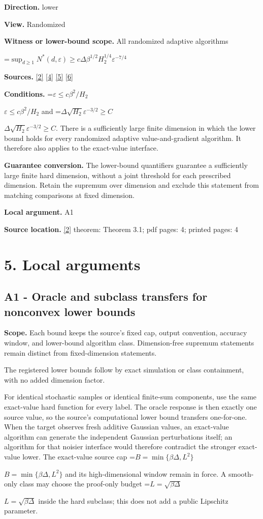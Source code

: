 \documentclass[10pt,a4paper]{article}
\newcommand{\AtlasMath}[1]{\par\begingroup\centering\setbox0=\hbox{$\displaystyle #1$}\ifdim\wd0>1.4\linewidth\typeout{ATLAS WIDE FORMULA: \the\wd0}\fi\ifdim\wd0>\linewidth\resizebox{\linewidth}{!}{\box0}\else\box0\fi\par\endgroup}
\newcommand{\AtlasInlineMath}[1]{\begingroup\setbox0=\hbox{$#1$}\ifdim\wd0>.4\linewidth\endgroup\AtlasMath{#1}\else\endgroup$#1$\fi}
\begin{document}
\textbf{Direction.} lower

\textbf{View.} Randomized

\textbf{Witness or lower-bound scope.} All randomized adaptive algorithms

\AtlasMath{\sup_{d\ge1}N^*(d,\varepsilon)\ge c\Delta\beta^{1/2}H_2^{1/4}\varepsilon^{-7/4}}
\textbf{Sources.} \href{https://arxiv.org/pdf/2610.00245v2}{[2]} \href{https://arxiv.org/html/2610.19652v1}{[4]} \href{https://arxiv.org/html/2609.00045v3}{[5]} \href{https://arxiv.org/html/2610.17074v1}{[6]}

\textbf{Conditions.} \AtlasInlineMath{\varepsilon\le c\beta^2/H_2} and \AtlasInlineMath{\Delta\sqrt{H_2}\varepsilon^{-3/2}\ge C}. There is a sufficiently large finite dimension in which the lower bound holds for every randomized adaptive value-and-gradient algorithm. It therefore also applies to the exact-value interface.

\textbf{Guarantee conversion.} The lower-bound quantifiers guarantee a sufficiently large finite hard dimension, without a joint threshold for each prescribed dimension. Retain the supremum over dimension and exclude this statement from matching comparisons at fixed dimension.

\textbf{Local argument.} A1

\textbf{Source location.} \href{https://arxiv.org/pdf/2610.00245v2}{[2]} theorem: Theorem 3.1; pdf pages: 4; printed pages: 4

\section{5. Local arguments}
\subsection{A1 - Oracle and subclass transfers for nonconvex lower bounds}
\textbf{Scope.} Each bound keeps the source's fixed cap, output convention, accuracy window, and lower-bound algorithm class. Dimension-free supremum statements remain distinct from fixed-dimension statements.

The registered lower bounds follow by exact simulation or class containment, with no added dimension factor.

For identical stochastic samples or identical finite-sum components, use the same exact-value hard function for every label. The oracle response is then exactly one source value, so the source's computational lower bound transfers one-for-one. When the target observes fresh additive Gaussian values, an exact-value algorithm can generate the independent Gaussian perturbations itself; an algorithm for that noisier interface would therefore contradict the stronger exact-value lower. The exact-value source cap \AtlasInlineMath{B=\min\{\beta\Delta,L^2\}} and its high-dimensional window remain in force. A smooth-only class may choose the proof-only budget \AtlasInlineMath{L=\sqrt{\beta\Delta}} inside the hard subclass; this does not add a public Lipschitz parameter.
\end{document}
